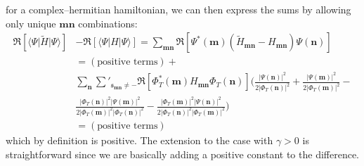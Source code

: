 for a complex--hermitian hamiltonian, we can then express the sums by allowing only unique $\mathbf{m}\mathbf{n}$ combinations:
\begin{equation}
\begin{split}
 \Re \left[\langle \Psi \lvert \widetilde{H}\rvert\Psi \rangle\right] & -\Re\left[ \langle \Psi |H|\Psi \rangle\right]=  \sum_{\mathbf{m}\mathbf{n}} \Re \left[\Psi^*(\mathbf{m}) (\widetilde{H}_{\mathbf{m}\mathbf{n}}-H_{\mathbf{m}\mathbf{n}})\Psi(\mathbf{n})\right]\\ 
&= (\mbox{positive terms}) + \\
&\sum_{\mathbf{n}} \sum'_{\mathfrak{s}_{\mathbf{m}\mathbf{n}} \neq -} \Re \left [ \Phi_T^*(\mathbf{m}) H_{\mathbf{m}\mathbf{n}} \Phi_T(\mathbf{n})\right ] \bigg( \frac{\lvert\Psi(\mathbf{n})\rvert^2}{2\lvert\Phi_T(\mathbf{n})\rvert^2} + \frac{\lvert\Psi(\mathbf{m})\rvert^2}{2\lvert\Phi_T(\mathbf{m})\rvert^2}-\\
& \frac{ \lvert \Phi_T(\mathbf{n})\rvert^2\lvert \Psi(\mathbf{m})\rvert^2}{2\lvert\Phi_T(\mathbf{m})\rvert^2 \lvert \Phi_T(\mathbf{n})\rvert^2} - \frac{ \lvert \Phi_T(\mathbf{m})\rvert^2\lvert \Psi(\mathbf{n})\rvert^2}{2 \lvert \Phi_T(\mathbf{n})\rvert^2\lvert\Phi_T(\mathbf{m})\rvert^2} \bigg)\\
&=  (\mbox{positive terms})
\end{split}
\end{equation}
which by definition is positive. The extension to the case with $\gamma>0$ is straightforward since we are basically adding a positive constant to the difference.

